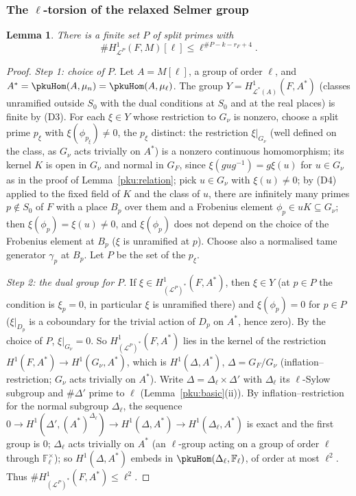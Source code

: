 \documentclass[10pt]{amsart}
\newtheorem{lemma}[theorem]{Lemma}
\theoremstyle{definition}
\theoremstyle{remark}
\begin{document}
\subsubsection{The \texorpdfstring{$\ell$}{l}-torsion of the relaxed Selmer group}\label{pku:ss-torsion}

\begin{lemma}\label{pku:torsion}
There is a finite set $P$ of split primes with
\[
\#H^1_{\mathcal L^P}(F,M)[\ell]\le\ell^{\#P-k-r_F+4}.
\]
\end{lemma}
\begin{proof}
\emph{Step 1: choice of $P$.} Let $A=M[\ell]$, a group of order $\ell$, and $A^*=\pkuHom(A,\mu_n)
=\pkuHom(A,\mu_\ell)$. The group $Y=H^1_{\mathcal L^*(A)}(F,A^*)$ (classes unramified outside $S_0$
with the dual conditions at $S_0$ and at the real places) is finite by (D3). For each $\xi\in Y$ whose
restriction to $G_\nu$ is nonzero, choose a split prime $p_\xi$ with $\xi(\phi_{p_\xi})\ne0$,
the $p_\xi$ distinct: the restriction $\xi|_{G_\nu}$ (well defined on the class, as $G_\nu$ acts
trivially on $A^*$) is a nonzero continuous homomorphism; its kernel $K$ is open in $G_\nu$ and normal
in $G_F$, since $\xi(gug^{-1})=g\xi(u)$ for $u\in G_\nu$ as in the proof of Lemma~\ref{pku:relation};
pick $u\in G_\nu$ with $\xi(u)\ne0$; by (D4) applied to the fixed field of $K$ and the class of $u$,
there are infinitely many primes $p\notin S_0$ of $F$ with a place $B_p$ over them and a Frobenius
element $\phi_p\in uK\subseteq G_\nu$; then $\xi(\phi_p)=\xi(u)\ne0$, and $\xi(\phi_p)$ does not depend
on the choice of the Frobenius element at $B_p$ ($\xi$ is unramified at $p$). Choose also a
normalised tame generator $\gamma_p$ at $B_p$. Let $P$ be the set of the $p_\xi$.

\emph{Step 2: the dual group for $P$.} If $\xi\in H^1_{(\mathcal L^P)^*}(F,A^*)$, then $\xi\in Y$
(at $p\in P$ the condition is $\xi_p=0$, in particular $\xi$ is unramified there) and
$\xi(\phi_p)=0$ for $p\in P$ ($\xi|_{D_p}$ is a coboundary for the trivial action of $D_p$ on $A^*$,
hence zero). By the choice of $P$, $\xi|_{G_\nu}=0$. So $H^1_{(\mathcal L^P)^*}(F,A^*)$ lies in the
kernel of the restriction $H^1(F,A^*)\to H^1(G_\nu,A^*)$, which is $H^1(\Delta,A^*)$, $\Delta=G_F/
G_\nu$ (inflation--restriction; $G_\nu$ acts trivially on $A^*$). Write $\Delta=\Delta_\ell\times
\Delta'$ with $\Delta_\ell$ its $\ell$-Sylow subgroup and $\#\Delta'$ prime to $\ell$
(Lemma~\ref{pku:basic}(ii)). By inflation--restriction for the normal subgroup $\Delta_\ell$, the sequence $0\to H^1(\Delta',(A^*)^{\Delta_\ell})\to H^1(\Delta,A^*)\to H^1(
\Delta_\ell,A^*)$ is exact and the first group is $0$; $\Delta_\ell$ acts trivially on $A^*$ (an
$\ell$-group acting on a group of order $\ell$ through $\mathbb F_\ell^\times$); so $H^1(\Delta,A^*)$
embeds in $\pkuHom(\Delta_\ell,\mathbb F_\ell)$, of order at most $\ell^2$. Thus
$\#H^1_{(\mathcal L^P)^*}(F,A^*)\le\ell^2$.


\end{proof}
\end{document}
